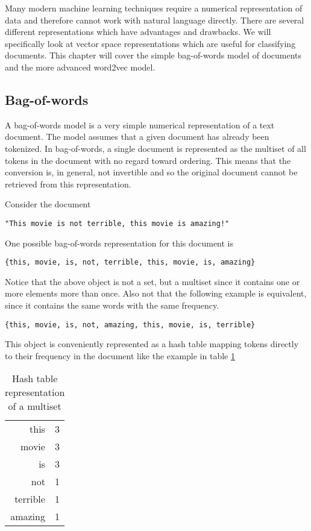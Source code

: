 Many modern machine learning techniques require a numerical representation of data and therefore cannot work with natural language directly.  There are several different representations which have advantages and drawbacks.  We will specifically look at vector space representations which are useful for classifying documents.  This chapter will cover the simple bag-of-words model of documents and the more advanced word2vec model.

\subsection{Bag-of-words}
A bag-of-words model is a very simple numerical representation of a text document.  The model assumes that a given document has already been tokenized.  In bag-of-words, a single document is represented as the multiset of all tokens in the document with no regard toward ordering.  This means that the conversion is, in general, not invertible and so the original document cannot be retrieved from this representation.

Consider the document
\begin{center}
\texttt{"This movie is not terrible, this movie is amazing!"}
\end{center}
One possible bag-of-words representation for this document is
\begin{center}
\texttt{\{this, movie, is, not, terrible, this, movie, is, amazing\}}
\end{center}
Notice that the above object is not a set, but a multiset since it contains one or more elements more than once.  Also not that the following example is equivalent, since it contains the same words with the same frequency.
\begin{center}
\texttt{\{this, movie, is, not, amazing, this, movie, is, terrible\}}
\end{center}

This object is conveniently represented as a hash table mapping tokens directly to their frequency in the document like the example in table \ref{tab:hash}
\begin{table}[h]
\centering
\begin{tabular}{ r l }
 this & 3 \\ 
 movie & 3 \\  
 is & 3 \\ 
 not & 1 \\
 terrible & 1 \\
 amazing & 1 \\
\end{tabular}
\caption{Hash table representation of a multiset}
\label{tab:hash}
\end{table}

